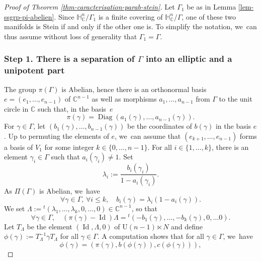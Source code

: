 \documentclass[JEP,XML,SOM,Unicode,NoEqCountersInSection,published]{cedram}
\theoremstyle{definition}
\newcommand{\C}{\mathbb{C}}
\newcommand{\HNC}{\mathbb{H}^{n}_{\C}}
\DeclareMathOperator{\Id}{Id}
\DeclareMathOperator{\Diag}{Diag}
\def\C{\mathbb{C}}
\newcommand{\HNC}{\mathbb{H}^{n}_{\C}}
\begin{document}
\begin{proof}[Proof of Theorem \ref{thm-caracterisation-parab-stein}] Let $\Gamma_1$ be as in Lemma \ref{lem-ssgrp-pi-abelien}. Since $\HNC/\Gamma_1$ is a finite covering of $\HNC/\Gamma$, one of these two manifolds is Stein if and only if the other one is. To simplify the notation, we~can thus assume without loss of generality that $\Gamma_1=\Gamma$.

\subsubsection*{Step 1. There is a separation of $\Gamma$ into an elliptic and a unipotent part}

The group $\pi(\Gamma)$ is Abelian, hence there is an orthonormal basis $e=(e_1,\dots,e_{n-1})$ of $\C^{n-1}$ as well as morphisms $a_1,\dots,a_{n-1}$ from $\Gamma$ to the unit circle in $\C$ such that, in the basis~$e$
\begin{equation*}
\pi(\gamma) = \Diag(a_1(\gamma),\dots,a_{n-1}(\gamma)).
\end{equation*}
For $\gamma \in \Gamma$, let $(b_1(\gamma),\dots,b_{n-1}(\gamma))$ be the coordinates of $b(\gamma)$ in the basis $e$.
Up to permuting the elements of $e$, we~can assume that $(e_{k+1},\dots,e_{n-1})$ forms a basis of $V_1$ for some integer $k\in \{0,\dots,n-1\}$. For all $i\in \{1,\dots,k\}$, there is an element $\gamma_i \in \Gamma$ such that $a_i(\gamma_i)\ne 1$. Set
\begin{equation*}
\lambda_i:= \frac{b_i(\gamma_i)}{1-a_i(\gamma_i)}.
\end{equation*}
As $\Pi(\Gamma)$ is Abelian, we~have
\begin{equation*}
\forall \gamma \in \Gamma,\, \forall i\le k,\quad b_i(\gamma)=\lambda_i(1-a_i(\gamma)).
\end{equation*}
We set $\Lambda:= {}^{t}(\lambda_1,\dots,\lambda_k,0,\dots,0) \in \C^{n-1}$, so that
\begin{equation*}
\forall \gamma \in \Gamma,\quad (\pi(\gamma)-\Id)\Lambda = {}^{t}(-b_1(\gamma),\dots,-b_k(\gamma),0,\dots 0).
\end{equation*}
Let $T_{\Lambda}$ be the element $(\Id,\Lambda,0)$ of $\mathrm{U}(n-1)\ltimes N$ and define $\phi(\gamma):=T_{\Lambda}^{-1}\gamma T_{\Lambda}$ for all $\gamma \in \Gamma$. A computation shows that for all $\gamma\in \Gamma$, we~have
\begin{equation*}
\phi(\gamma) = (\pi(\gamma),b(\phi(\gamma)),c(\phi(\gamma))),
\end{equation*}

\end{proof}
\end{document}
